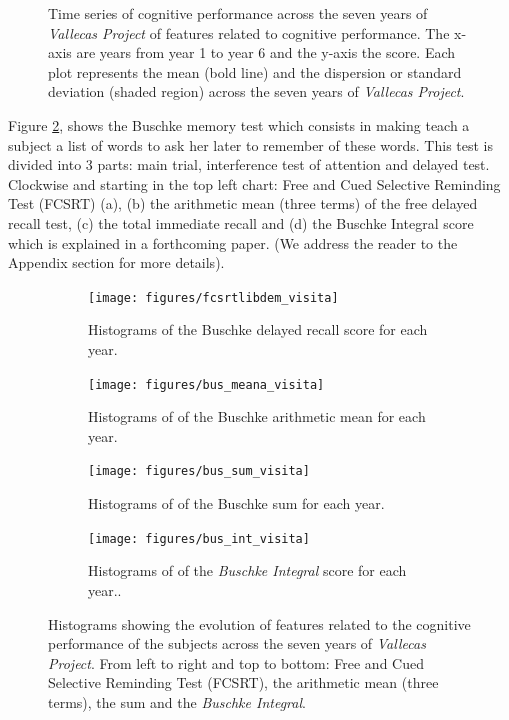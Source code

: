 \documentclass[11pt]{article}
\theoremstyle{definition}
\theoremstyle{remark}
\begin{document}
\begin{figure}[!htb]
    \caption{Time series of cognitive performance across the seven years of \emph{Vallecas Project} of features related to cognitive performance. The x-axis are years from year 1 to year 6 and the y-axis the score. Each plot represents the mean (bold line) and the dispersion or standard deviation (shaded region) across the seven years of \emph{Vallecas Project}.}
    \label{fig:cogper4}
\end{figure}

Figure \ref{fig:cogperyearsbus}, shows the Buschke memory test which consists in making teach a subject a list of words to ask her later to remember of these words. This test is divided into 3 parts: main trial, interference test of attention and delayed test.
Clockwise and starting in the top left chart: Free and Cued Selective Reminding Test (FCSRT) (a), (b) the arithmetic mean (three terms) of the free delayed recall test, (c) the total immediate recall and (d) the Buschke Integral score which is explained in a forthcoming paper. (We address the reader to the Appendix section for more details).


\begin{figure}[!htb]
    \centering
    \begin{subfigure}[t]{0.4\textwidth}
        \centering
        \texttt{[image: figures/fcsrtlibdem\_visita]}
        \caption{Histograms of the Buschke delayed recall score for each year.}
    \end{subfigure}
    \hfill
    \begin{subfigure}[t]{0.4\textwidth}
        \centering
        \texttt{[image: figures/bus\_meana\_visita]}
        \caption{Histograms of of the Buschke arithmetic mean for each year.}
    \end{subfigure}%
    
     \begin{subfigure}[t]{0.4\textwidth}
        \centering
        \texttt{[image: figures/bus\_sum\_visita]}
        \caption{Histograms of of the Buschke sum for each year.}
    \end{subfigure}
    \hfill
    \begin{subfigure}[t]{0.4\textwidth}
        \centering
        \texttt{[image: figures/bus\_int\_visita]}
        \caption{Histograms of of the \emph{Buschke Integral} score for each year..}
    \end{subfigure}%
   
    \caption{Histograms showing the evolution of features related to the cognitive performance of the subjects across the seven years of \emph{Vallecas Project}. From left to right and top to bottom: 
    Free and Cued Selective Reminding Test (FCSRT), the arithmetic mean (three terms), the sum and the \emph{Buschke Integral}.}
    \label{fig:cogperyearsbus}
\end{figure}
\end{document}
